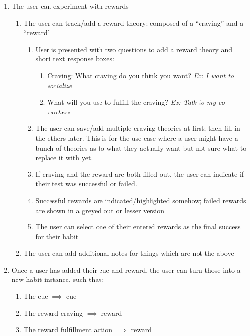 \begin{enumerate}
\begin{enumerate}
            \end{enumerate}
        \item The user can experiment with rewards
        \begin{enumerate}
            \item The user can track/add a reward theory: composed of a “craving” and a “reward”
            \begin{enumerate}
                \item User is presented with two questions to add a reward theory and short text response boxes:
                \begin{enumerate}
                    \item Craving: What craving do you think you want? \textit{Ex: I want to socialize}
                    \item What will you use to fulfill the craving? \textit{Ex: Talk to my co-workers}
                \end{enumerate}
                \item The user can save/add multiple craving theories at first; then fill in the others later. This is for the use case where a user might have a bunch of theories as to what they actually want but not sure what to replace it with yet.
                \item If craving and the reward are both filled out, the user can indicate if their test was successful or failed.
                \item Successful rewards are indicated/highlighted somehow; failed rewards are shown in a greyed out or lesser version
                \item The user can select one of their entered rewards as the final success for their habit 
            \end{enumerate}
            \item The user can add additional notes for things which are not the above
        \end{enumerate}
        \item Once a user has added their cue and reward, the user can turn those into a new habit instance, such that:
        \begin{enumerate}
            \item The cue $\implies$ cue
            \item The reward craving $\implies$ reward
            \item The reward fulfillment action $\implies$ reward
        \end{enumerate}

\end{enumerate}
